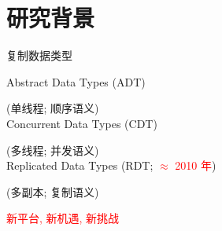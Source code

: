 
\section{研究背景}

\begin{frame}{复制数据类型}
  \begin{center}
	Abstract Data Types {(\small \textsc{ADT})} 

	{\small (单线程; 顺序语义)}\\[0.50cm]

	Concurrent Data Types {\small (\textsc{CDT})} 

	{\small (多线程; 并发语义)}\\[0.50cm]

	Replicated Data Types {\small (\textsc{RDT}; \textcolor{red}{$\approx$ 2010 年})} 

	{\small (多副本; 复制语义)}\\
  

	\textcolor{red}{新平台, 新机遇, 新挑战}
  \end{center}
\end{frame}

